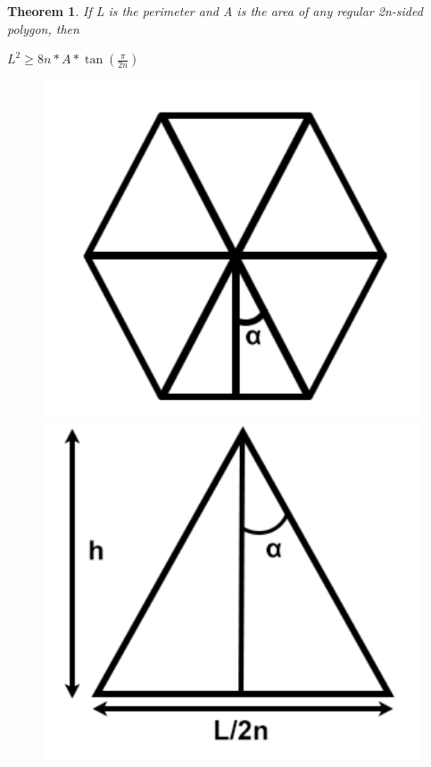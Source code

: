 \documentclass[a4paper]{book}
\newtheorem{theorem}{Theorem}%
\numberwithin{theorem}{section}%
\begin{document}
\begin{theorem}
    If L is the perimeter and A is the area of any regular 2n-sided polygon, then 
    \begin{center}
        $L^{2}\geq8n*A*\tan{(\frac{\pi}{2n})}$
    \end{center}
\end{theorem}

\begin{figure} [h]
    \centering
    \begin{minipage}{0.5\textwidth}
        \centering
        \includegraphics[width=1\textwidth]{isofig8.png} %
        \caption{}
    \end{minipage}\hfill
    \begin{minipage}{0.5\textwidth}
        \centering
        \includegraphics[width=1\textwidth]{isofig9.png} %
        \caption{}
    \end{minipage}
\end{figure}
\end{document}
